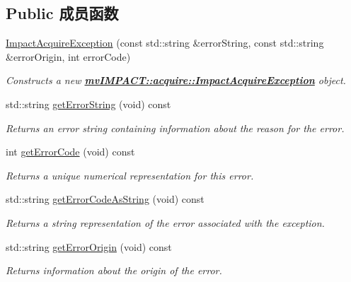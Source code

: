 \subsection*{Public 成员函数}
\begin{DoxyCompactItemize}
\item 
\hyperlink{classmv_i_m_p_a_c_t_1_1acquire_1_1_impact_acquire_exception_af29f492f738d5c97dd281f480a2a0dfe}{Impact\+Acquire\+Exception} (const std\+::string \&error\+String, const std\+::string \&error\+Origin, int error\+Code)
\begin{DoxyCompactList}\small\item\em Constructs a new {\bfseries \hyperlink{classmv_i_m_p_a_c_t_1_1acquire_1_1_impact_acquire_exception}{mv\+I\+M\+P\+A\+C\+T\+::acquire\+::\+Impact\+Acquire\+Exception}} object. \end{DoxyCompactList}\item 
\hypertarget{classmv_i_m_p_a_c_t_1_1acquire_1_1_impact_acquire_exception_aff06d1267d4f494b5974df9fa5cff7ef}{std\+::string \hyperlink{classmv_i_m_p_a_c_t_1_1acquire_1_1_impact_acquire_exception_aff06d1267d4f494b5974df9fa5cff7ef}{get\+Error\+String} (void) const }\label{classmv_i_m_p_a_c_t_1_1acquire_1_1_impact_acquire_exception_aff06d1267d4f494b5974df9fa5cff7ef}

\begin{DoxyCompactList}\small\item\em Returns an error string containing information about the reason for the error. \end{DoxyCompactList}\item 
\hypertarget{classmv_i_m_p_a_c_t_1_1acquire_1_1_impact_acquire_exception_a44f96f7fe1c7624047936a5d4d5b6ee1}{int \hyperlink{classmv_i_m_p_a_c_t_1_1acquire_1_1_impact_acquire_exception_a44f96f7fe1c7624047936a5d4d5b6ee1}{get\+Error\+Code} (void) const }\label{classmv_i_m_p_a_c_t_1_1acquire_1_1_impact_acquire_exception_a44f96f7fe1c7624047936a5d4d5b6ee1}

\begin{DoxyCompactList}\small\item\em Returns a unique numerical representation for this error. \end{DoxyCompactList}\item 
std\+::string \hyperlink{classmv_i_m_p_a_c_t_1_1acquire_1_1_impact_acquire_exception_a0980b819b612805748f4487d810c3cee}{get\+Error\+Code\+As\+String} (void) const 
\begin{DoxyCompactList}\small\item\em Returns a string representation of the error associated with the exception. \end{DoxyCompactList}\item 
std\+::string \hyperlink{classmv_i_m_p_a_c_t_1_1acquire_1_1_impact_acquire_exception_aaf907fa8df1bfa0a48374f65dac0b86a}{get\+Error\+Origin} (void) const 
\begin{DoxyCompactList}\small\item\em Returns information about the origin of the error. \end{DoxyCompactList}\end{DoxyCompactItemize}
